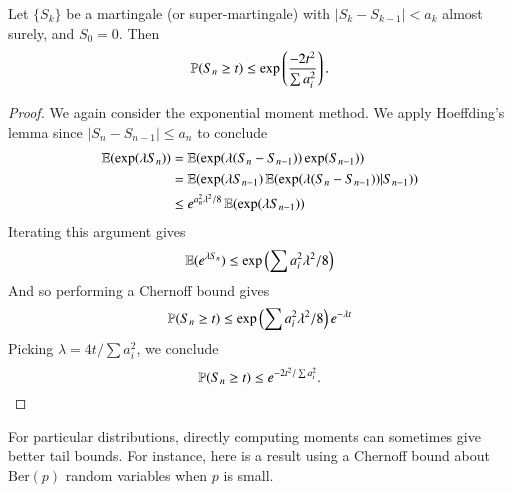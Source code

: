 \begin{theorem}
    Let $\{ S_k \}$ be a martingale (or super-martingale) with $|S_k - S_{k-1}| < a_k$ almost surely, and $S_0 = 0$. Then
    \[ \mathbb{P}(S_n \geq t) \leq \exp \left( \frac{-2t^2}{\sum a_i^2} \right). \]
\end{theorem}
\begin{proof}
    We again consider the exponential moment method. We apply Hoeffding's lemma since $|S_n - S_{n-1}| \leq a_n$ to conclude
    \begin{align*}
        \operatorname{\mathbb{E}}(\exp(\lambda S_n)) &= \operatorname{\mathbb{E}}(\exp(\lambda (S_n - S_{n-1})) \exp(S_{n-1}))\\
        &= \operatorname{\mathbb{E}}( \exp(\lambda S_{n-1}) \operatorname{\mathbb{E}}( \exp(\lambda (S_n - S_{n-1})) | S_{n-1} ) )\\
        &\leq e^{a_n^2 \lambda^2 / 8} \operatorname{\mathbb{E}}( \exp(\lambda S_{n-1}) )
    \end{align*}
    Iterating this argument gives
    \[ \operatorname{\mathbb{E}}(e^{\lambda S_n}) \leq \exp \left( \sum a_i^2 \lambda^2 / 8 \right) \]
    And so performing a Chernoff bound gives
    \[ \mathbb{P}(S_n \geq t) \leq \exp \left( \sum a_i^2 \lambda^2 / 8 \right) e^{-\lambda t} \]
    Picking $\lambda = 4t/\sum a_i^2$, we conclude
    \[ \mathbb{P}(S_n \geq t) \leq e^{-2t^2/ \sum a_i^2}. \qedhere  \]
\end{proof}

For particular distributions, directly computing moments can sometimes give better tail bounds. For instance, here is a result using a Chernoff bound about $\text{Ber}(p)$ random variables when $p$ is small.

